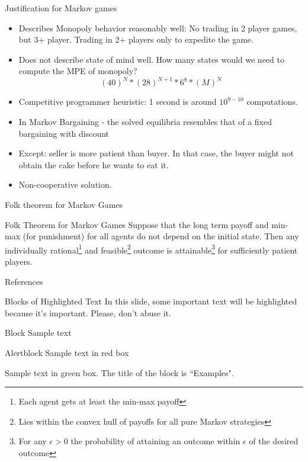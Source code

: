 \documentclass[aspectratio=169,xcolor=dvipsnames]{beamer}
\begin{document}
\begin{frame}{Justification for Markov games}
    \begin{itemize}
        \item Describes Monopoly behavior reasonably well: No trading in 2 player games, but 3+ player. Trading in 2+ players only to expedite the game.
        \item Does not describe state of mind well. How many states would we need to compute the MPE of monopoly? \[
        (40)^N * (28)^{N+1} * 6^8 * (M)^N
        \]
        \item Competitive programmer heuristic: 1 second is around $10^{9-10}$ computations.
        \item In Markov Bargaining - the solved equilibria resembles that of a fixed bargaining with discount
        \item \alert{Except:} seller is more patient than buyer. In that case, the buyer might not obtain the cake before he wants to eat it.
        \item Non-cooperative solution.
    \end{itemize}
\end{frame}
\begin{frame}{Folk theorem for Markov Games}
    \begin{alertblock}{Folk Theorem for Markov Games \cite{Dutta1995}}
        Suppose that the long term payoff and min-max (for punishment) for all agents do not depend on the initial state. Then any individually rational\footnote{Each agent gets at least the min-max payoff} and feasible\footnote{Lies within the convex hull of payoffs for all pure Markov strategies} outcome is attainable\footnote{For any $\epsilon>0$ the probability of attaining an outcome within $\epsilon$ of the desired outcome} for sufficiently patient players.
    \end{alertblock}
\end{frame}


\begin{frame}{References}
    \footnotesize
    
    
\end{frame}

\iffalse
\begin{frame}{Blocks of Highlighted Text}
    In this slide, some important text will be \alert{highlighted} because it's important. Please, don't abuse it.

    \begin{block}{Block}
        Sample text
    \end{block}

    \begin{alertblock}{Alertblock}
        Sample text in red box
    \end{alertblock}

    \begin{examples}
        Sample text in green box. The title of the block is ``Examples".
    \end{examples}
\end{frame}
\end{document}
